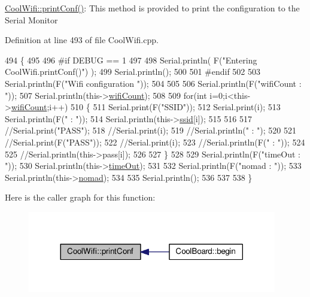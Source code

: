 \hyperlink{class_cool_wifi_a9e6105c6d13d35ec510f6633da9e0223}{Cool\+Wifi\+::print\+Conf()}\+: This method is provided to print the configuration to the Serial Monitor 

Definition at line 493 of file Cool\+Wifi.\+cpp.


\begin{DoxyCode}
494 \{
495 
496 \textcolor{preprocessor}{#if DEBUG == 1 }
497 
498     Serial.println( F(\textcolor{stringliteral}{"Entering CoolWifi.printConf()"}) );
499     Serial.println();   
500 
501 \textcolor{preprocessor}{#endif}
502     
503     Serial.println(F(\textcolor{stringliteral}{"Wifi configuration "}));
504 
505     
506     Serial.println(F(\textcolor{stringliteral}{"wifiCount : "}));
507     Serial.println(this->\hyperlink{class_cool_wifi_ab133bd92fcb895b884deecd6678592e4}{wifiCount});
508     
509     \textcolor{keywordflow}{for}(\textcolor{keywordtype}{int} i=0;i<this->\hyperlink{class_cool_wifi_ab133bd92fcb895b884deecd6678592e4}{wifiCount};i++)
510     \{   
511         Serial.print(F(\textcolor{stringliteral}{"SSID"}));
512         Serial.print(i);
513         Serial.println(F(\textcolor{stringliteral}{" : "}));
514         Serial.println(this->\hyperlink{class_cool_wifi_a893b21d0fed821438733bba2e73fb4c2}{ssid}[i]);
515                 
516 
517         \textcolor{comment}{//Serial.print("PASS");}
518         \textcolor{comment}{//Serial.print(i);}
519         \textcolor{comment}{//Serial.println(" : ");}
520 
521         \textcolor{comment}{//Serial.print(F("PASS"));}
522         \textcolor{comment}{//Serial.print(i);}
523         \textcolor{comment}{//Serial.println(F(" : "));}
524 
525         \textcolor{comment}{//Serial.println(this->pass[i]);}
526         
527     \}
528     
529     Serial.println(F(\textcolor{stringliteral}{"timeOut : "}));
530     Serial.println(this->\hyperlink{class_cool_wifi_a952111605f25156588b5632caaba1c6f}{timeOut});
531 
532     Serial.println(F(\textcolor{stringliteral}{"nomad : "}));
533     Serial.println(this->\hyperlink{class_cool_wifi_ab7d9643c4af7bac3be331ef008b2ea27}{nomad});
534 
535     Serial.println();
536 
537 
538 \}
\end{DoxyCode}
Here is the caller graph for this function\+:\nopagebreak
\begin{figure}[H]
\begin{center}
\leavevmode
\includegraphics[width=308pt]{d7/d29/class_cool_wifi_a9e6105c6d13d35ec510f6633da9e0223_icgraph}
\end{center}
\end{figure}
\mbox{\label{class_cool_wifi_a1c7b4d82a4098d346e7593dce92039fa}} 
